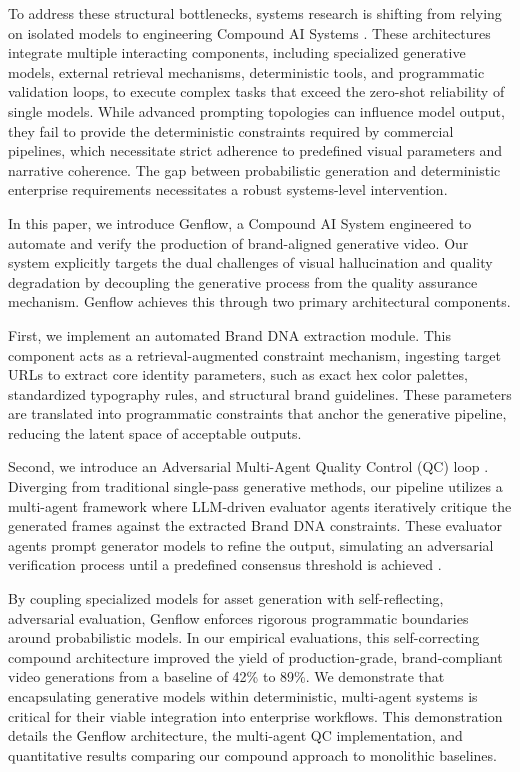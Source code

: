 \documentclass[sigconf]{acmart}
\begin{document}
To address these structural bottlenecks, systems research is shifting from relying on isolated models to engineering Compound AI Systems \cite{zaharia2024shift}. These architectures integrate multiple interacting components, including specialized generative models, external retrieval mechanisms, deterministic tools, and programmatic validation loops, to execute complex tasks that exceed the zero-shot reliability of single models. While advanced prompting topologies can influence model output, they fail to provide the deterministic constraints required by commercial pipelines, which necessitate strict adherence to predefined visual parameters and narrative coherence. The gap between probabilistic generation and deterministic enterprise requirements necessitates a robust systems-level intervention.

In this paper, we introduce Genflow, a Compound AI System engineered to automate and verify the production of brand-aligned generative video. Our system explicitly targets the dual challenges of visual hallucination and quality degradation by decoupling the generative process from the quality assurance mechanism. Genflow achieves this through two primary architectural components.

First, we implement an automated Brand DNA extraction module. This component acts as a retrieval-augmented constraint mechanism, ingesting target URLs to extract core identity parameters, such as exact hex color palettes, standardized typography rules, and structural brand guidelines. These parameters are translated into programmatic constraints that anchor the generative pipeline, reducing the latent space of acceptable outputs.

Second, we introduce an Adversarial Multi-Agent Quality Control (QC) loop \cite{du2024improving, liang2024encouraging}. Diverging from traditional single-pass generative methods, our pipeline utilizes a multi-agent framework where LLM-driven evaluator agents iteratively critique the generated frames against the extracted Brand DNA constraints. These evaluator agents prompt generator models to refine the output, simulating an adversarial verification process until a predefined consensus threshold is achieved \cite{shinn2023reflexion}.

By coupling specialized models for asset generation with self-reflecting, adversarial evaluation, Genflow enforces rigorous programmatic boundaries around probabilistic models. In our empirical evaluations, this self-correcting compound architecture improved the yield of production-grade, brand-compliant video generations from a baseline of 42\% to 89\%. We demonstrate that encapsulating generative models within deterministic, multi-agent systems is critical for their viable integration into enterprise workflows. This demonstration details the Genflow architecture, the multi-agent QC implementation, and quantitative results comparing our compound approach to monolithic baselines.
\end{document}
